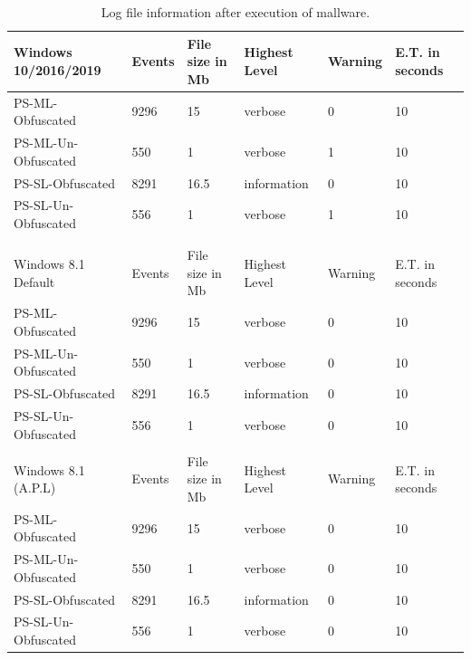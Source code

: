 \documentclass{article}%
\begin{document}
\begin{table}
\caption {Log file information after execution of mallware.} \label{tab:table_six}
\begin{center}
\begin{tabular}{|l|l|l|l|l|l|}
\hline
Windows 10/2016/2019 & Events & File size in Mb & Highest Level & Warning & E.T. in seconds  \\\hline
PS-ML-Obfuscated     & 9296   & 15              & verbose       & 0       & 10               \\\hline
PS-ML-Un-Obfuscated  & 550    & 1               & verbose       & 1       & 10               \\\hline
PS-SL-Obfuscated     & 8291   & 16.5            & information   & 0       & 10               \\\hline
PS-SL-Un-Obfuscated  & 556    & 1               & verbose       & 1       & 10               \\\hline
                     &        &                 &               &         &                  \\\hline
                     &        &                 &               &         &                  \\\hline
Windows 8.1 Default  & Events & File size in Mb & Highest Level & Warning & E.T. in seconds  \\\hline
PS-ML-Obfuscated     & 9296   & 15              & verbose       & 0       & 10               \\\hline
PS-ML-Un-Obfuscated  & 550    & 1               & verbose       & 0       & 10               \\\hline
PS-SL-Obfuscated     & 8291   & 16.5            & information   & 0       & 10               \\\hline
PS-SL-Un-Obfuscated  & 556    & 1               & verbose       & 0       & 10               \\\hline
                     &        &                 &               &         &                  \\\hline
Windows 8.1 (A.P.L)  & Events & File size in Mb & Highest Level & Warning & E.T. in seconds  \\\hline
PS-ML-Obfuscated     & 9296   & 15              & verbose       & 0       & 10               \\\hline
PS-ML-Un-Obfuscated  & 550    & 1               & verbose       & 0       & 10               \\\hline
PS-SL-Obfuscated     & 8291   & 16.5            & information   & 0       & 10               \\\hline
PS-SL-Un-Obfuscated  & 556    & 1               & verbose       & 0       & 10               \\\hline
\end{tabular}
\end{center}
\end{table}
\end{document}
